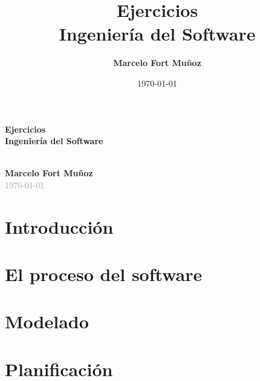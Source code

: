 \documentclass[a4paper,11pt]{article}
\title{\Huge\textbf{Ejercicios} \\ \Large\textcolor{primaryblue}{Ingeniería del Software}}
\author{\textbf{Marcelo Fort Muñoz}}
\date{\today}
\begin{document}
    \begin{titlepage}
        \centering
        \vspace*{2cm}

        {\Huge\textbf{Ejercicios}}\\[0.5cm]
        {\Large\textcolor{primaryblue}{\textbf{Ingeniería del Software}}}\\[2cm]

        \\[2cm]

        {\Large\textbf{Marcelo Fort Muñoz}}\\[1cm]
        {\large\textcolor{darkgray}{\today}}

        \vfill

    \end{titlepage}

    \tableofcontents
    \newpage


    \part{\textcolor{primaryblue}{Introducción}}\label{part:introduccion}
    


    \clearpage


    \part{\textcolor{primaryblue}{El proceso del software}}\label{part:el-proceso-del-software}
    


    \clearpage


    \part{\textcolor{primaryblue}{Modelado}}\label{part:modelado}
    


    \clearpage


    \part{\textcolor{primaryblue}{Planificación}}\label{part:planificacion}
    
\end{document}
